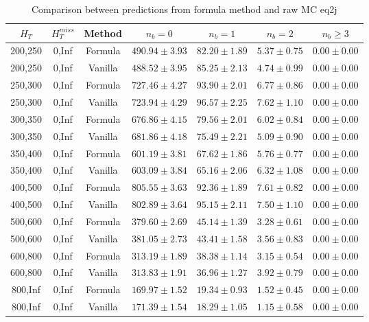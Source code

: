 \begin{longtable}{ | c | c | c | c | c | c | c | }
\caption{Comparison between predictions from formula method and raw MC eq2j} \label{tab:eq2j} \\    \hline 
$H_{T}$ & $H_{T}^{miss}$ & Method & $n_{b} = 0$ & $n_{b} = 1$ & $n_{b} = 2$ & $n_{b} \ge 3$ \\ \hline200,250 & 0,Inf & Formula  & $   490.94 \pm  3.93 $ & $    82.20 \pm  1.89 $ & $     5.37 \pm  0.75 $ & $     0.00 \pm  0.00 $  \\  
200,250 & 0,Inf & Vanilla  & $   488.52 \pm  3.95 $ & $    85.25 \pm  2.13 $ & $     4.74 \pm  0.99 $ & $     0.00 \pm  0.00 $  \\ \hline 
250,300 & 0,Inf & Formula  & $   727.46 \pm  4.27 $ & $    93.90 \pm  2.01 $ & $     6.77 \pm  0.86 $ & $     0.00 \pm  0.00 $  \\  
250,300 & 0,Inf & Vanilla  & $   723.94 \pm  4.29 $ & $    96.57 \pm  2.25 $ & $     7.62 \pm  1.10 $ & $     0.00 \pm  0.00 $  \\ \hline 
300,350 & 0,Inf & Formula  & $   676.86 \pm  4.15 $ & $    79.56 \pm  2.01 $ & $     6.02 \pm  0.84 $ & $     0.00 \pm  0.00 $  \\  
300,350 & 0,Inf & Vanilla  & $   681.86 \pm  4.18 $ & $    75.49 \pm  2.21 $ & $     5.09 \pm  0.90 $ & $     0.00 \pm  0.00 $  \\ \hline 
350,400 & 0,Inf & Formula  & $   601.19 \pm  3.81 $ & $    67.62 \pm  1.86 $ & $     5.76 \pm  0.77 $ & $     0.00 \pm  0.00 $  \\  
350,400 & 0,Inf & Vanilla  & $   603.09 \pm  3.84 $ & $    65.16 \pm  2.06 $ & $     6.32 \pm  1.08 $ & $     0.00 \pm  0.00 $  \\ \hline 
400,500 & 0,Inf & Formula  & $   805.55 \pm  3.63 $ & $    92.36 \pm  1.89 $ & $     7.61 \pm  0.82 $ & $     0.00 \pm  0.00 $  \\  
400,500 & 0,Inf & Vanilla  & $   802.89 \pm  3.64 $ & $    95.15 \pm  2.11 $ & $     7.50 \pm  1.10 $ & $     0.00 \pm  0.00 $  \\ \hline 
500,600 & 0,Inf & Formula  & $   379.60 \pm  2.69 $ & $    45.14 \pm  1.39 $ & $     3.28 \pm  0.61 $ & $     0.00 \pm  0.00 $  \\  
500,600 & 0,Inf & Vanilla  & $   381.05 \pm  2.73 $ & $    43.41 \pm  1.58 $ & $     3.56 \pm  0.83 $ & $     0.00 \pm  0.00 $  \\ \hline 
600,800 & 0,Inf & Formula  & $   313.19 \pm  1.89 $ & $    38.38 \pm  1.14 $ & $     3.15 \pm  0.54 $ & $     0.00 \pm  0.00 $  \\  
600,800 & 0,Inf & Vanilla  & $   313.83 \pm  1.91 $ & $    36.96 \pm  1.27 $ & $     3.92 \pm  0.79 $ & $     0.00 \pm  0.00 $  \\ \hline 
800,Inf & 0,Inf & Formula  & $   169.97 \pm  1.52 $ & $    19.34 \pm  0.93 $ & $     1.52 \pm  0.45 $ & $     0.00 \pm  0.00 $  \\  
800,Inf & 0,Inf & Vanilla  & $   171.39 \pm  1.54 $ & $    18.29 \pm  1.05 $ & $     1.15 \pm  0.58 $ & $     0.00 \pm  0.00 $  \\ \hline 
    \hline 
    \hline 
\end{longtable}
